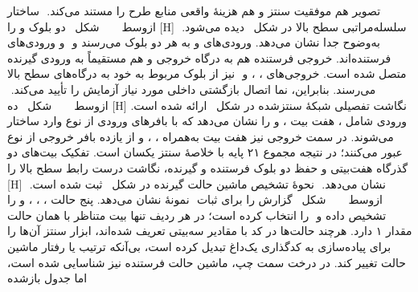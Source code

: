 ‫تصویر هم موفقیت سنتز و هم هزینهٔ واقعی منابع طرح را مستند می‌کند.
‫
‫ساختار سلسله‌مراتبی سطح بالا در
‫شکل~ دیده می‌شود.
‫
‫[H]
‫‌ازوسط
‫
‫
‫
‫
‫
‫شکل~ دو بلوک  و  را
‫به‌وضوح جدا نشان می‌دهد. ورودی‌های  و  به هر دو بلوک می‌رسند و
‫ و  ورودی‌های فرستنده‌اند. خروجی  فرستنده
‫هم به درگاه خروجی  و هم مستقیماً به ورودی 
‫گیرنده متصل شده است.
‫خروجی‌های ، ،  و
‫ نیز از بلوک مربوط به خود به درگاه‌های سطح بالا می‌رسند. بنابراین، نما
‫اتصال بازگشتی داخلی مورد نیاز آزمایش را تأیید می‌کند.
‫
‫نگاشت تفصیلی شبکهٔ سنتزشده در
‫شکل~ ارائه شده است.
‫
‫[H]
‫‌ازوسط
‫
‫
‫
‫
‫
‫شکل~ ده ورودی شامل ، هفت بیت
‫،  و  را نشان می‌دهد که با بافرهای
‫ورودی از نوع  وارد ساختار می‌شوند. در سمت
‫خروجی نیز هفت بیت  به‌همراه
‫، ،  و  از یازده بافر
‫خروجی از نوع  عبور می‌کنند؛ در نتیجه مجموع
‫۲۱ پایه با خلاصهٔ سنتز یکسان است. تفکیک
‫بیت‌های دو گذرگاه هفت‌بیتی و حفظ دو بلوک فرستنده و گیرنده، نگاشت درست
‫رابط سطح بالا را
‫نشان می‌دهد.
‫
‫نحوهٔ تشخیص ماشین حالت گیرنده در شکل~ ثبت شده است.
‫
‫[H]
‫‌ازوسط
‫
‫
‫
‫
‫
‫شکل~ گزارش  را برای ثبات
‫ نمونهٔ  نشان می‌دهد.  پنج حالت
‫، ، ،  و  را تشخیص داده و
‫ را  انتخاب کرده است؛ در هر ردیف تنها بیت متناظر با همان
‫حالت مقدار ۱ دارد. هرچند حالت‌ها در کد  با مقادیر سه‌بیتی تعریف شده‌اند، ابزار
‫سنتز آن‌ها را برای پیاده‌سازی به کدگذاری یک‌داغ تبدیل کرده
‫است، بی‌آنکه ترتیب یا رفتار ماشین
‫حالت تغییر کند. در درخت سمت چپ، ماشین حالت فرستنده نیز شناسایی شده است، اما جدول بازشده
